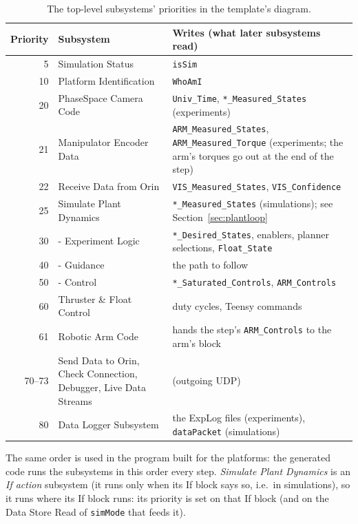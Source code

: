 \documentclass[11pt,a4paper]{article}
\newcommand{\fn}[1]{\texttt{#1}}
\begin{document}
\begin{table}[h]
\centering\small
\caption{The top-level subsystems' priorities in the template's diagram.}
\label{tab:priorities}
\begin{tabular}{@{}r >{\raggedright\arraybackslash}p{4.9cm} >{\raggedright\arraybackslash}p{8.6cm}@{}}
\toprule
Priority & Subsystem & Writes (what later subsystems read) \\
\midrule
5  & Simulation Status            & \fn{isSim} \\
10 & Platform Identification      & \fn{WhoAmI} \\
20 & PhaseSpace Camera Code       & \fn{Univ\_Time}, \fn{*\_Measured\_States} (experiments) \\
21 & Manipulator Encoder Data     & \fn{ARM\_Measured\_States}, \fn{ARM\_Measured\_Torque} (experiments; the arm's torques go out at the end of the step) \\
22 & Receive Data from Orin       & \fn{VIS\_Measured\_States}, \fn{VIS\_Confidence} \\
25 & Simulate Plant Dynamics      & \fn{*\_Measured\_States} (simulations); see Section~\ref{sec:plantloop} \\
30 & 1 - Experiment Logic         & \fn{*\_Desired\_States}, enablers, planner selections, \fn{Float\_State} \\
40 & 2 - Guidance                 & the path to follow \\
50 & 3 - Control                  & \fn{*\_Saturated\_Controls}, \fn{ARM\_Controls} \\
60 & Thruster \& Float Control    & duty cycles, Teensy commands \\
61 & Robotic Arm Code             & hands the step's \fn{ARM\_Controls} to the arm's block \\
70--73 & Send Data to Orin, Check Connection, Debugger, Live Data Streams & (outgoing UDP) \\
80 & Data Logger Subsystem        & the ExpLog files (experiments), \fn{dataPacket} (simulations) \\
\bottomrule
\end{tabular}
\end{table}

The same order is used in the program built for the platforms: the generated code runs the subsystems in
this order every step. \emph{Simulate Plant Dynamics} is an \emph{If action} subsystem (it runs only when
its If block says so, i.e.\ in simulations), so it runs where its If block runs: its priority is set on that
If block (and on the Data Store Read of \fn{simMode} that feeds it).
\end{document}
